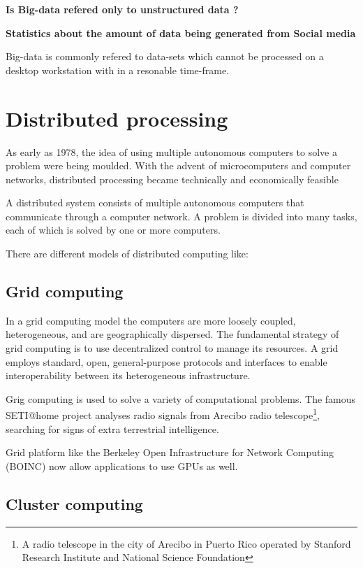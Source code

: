 \documentclass[12pt,a4paper]{report}
\begin{document}
\cite{website:ibm-bigdata} 

{\bf Is Big-data refered only to unstructured data ?}


{\bf Statistics about the amount of data being generated from Social media}

Big-data is commonly refered to data-sets which cannot be processed on a
desktop workstation with in a resonable time-frame.

\section{Distributed processing}

As early as 1978, the idea of using multiple autonomous computers to solve a problem were being
moulded. With the  advent  of  microcomputers and computer networks, distributed processing
became technically and economically feasible \cite{chu1978distributed}

A distributed system consists of multiple autonomous computers that communicate through a computer network.
A problem is divided into many tasks, each of which is solved by one or more computers.

There are different models of distributed computing like:

\subsection{Grid computing}

In a grid computing model the computers are more loosely coupled, heterogeneous, and are geographically dispersed.
The fundamental strategy of grid computing is to use decentralized control to
manage its resources.\cite{foster2002grid} A grid employs standard, open, general-purpose protocols and interfaces to enable interoperability between its heterogeneous infrastructure. 

Grig computing is used to solve a variety of computational problems. The famous SETI@home project 
analyses radio signals from  Arecibo radio telescope\footnote{A radio telescope in the city of 
Arecibo in Puerto Rico operated by Stanford Research Institute and National Science Foundation},
searching for signs of extra terrestrial intelligence.

Grid platform like the Berkeley Open Infrastructure for Network Computing
(BOINC) now allow applications to use GPUs as well.\cite{website:boinc} 

\subsection{Cluster computing}
\end{document}

